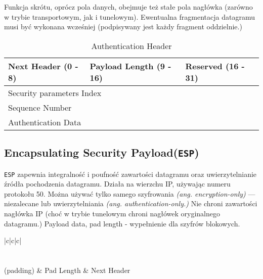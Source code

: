 \documentclass{article}
\begin{document}
Funkcja skrótu, oprócz pola danych, obejmuje też stałe pola nagłówka (zarówno w trybie transportowym,
jak i tunelowym). Ewentualna fragmentacja datagramu musi być wykonana wcześniej (podpisywany jest
każdy fragment oddzielnie.)

\begin{table}
  \begin{tabular}{@{}lll@{}}
    \toprule
    \multicolumn{1}{|l|}{Next Header (0 - 8)} & \multicolumn{1}{l|}{Payload Length (9 - 16)} & \multicolumn{1}{l|}{Reserved (16 - 31)} \\ \midrule
    \multicolumn{3}{|l|}{Security parameters Index} \\ \midrule
    \multicolumn{3}{|l|}{Sequence Number} \\ \midrule
    \multicolumn{3}{|l|}{Authentication Data} \\ \bottomrule
  \end{tabular}
  \caption{Authentication Header}
  \label{AH}
\end{table}

\subsection{Encapsulating Security Payload({\tt ESP})}

{\tt ESP} zapewnia integralność i poufność zawartości datagramu oraz uwierzytelnianie źródła pochodzenia datagramu.
Działa na wierzchu IP, używając numeru protokołu 50.
Można używać tylko samego szyfrowania \emph{(ang. encryption-only)} --- niezalecane lub uwierzytelniania \emph{(ang. authentication-only.)}
Nie chroni zawartości nagłówka IP (choć w trybie tunelowym chroni nagłówek oryginalnego datagramu.)
Payload data, pad length - wypełnienie dla szyfrów blokowych.

\begin{table}
  \begin{tabular}{|c|c|c|}
    \hline
     \\ \hline
     \\ \hline
     \\  
    (padding) & Pad Length & Next Header \\ \hline
   \\ \hline
  \end{tabular}
  \caption{Encapsulating Security Payload}
  \label{ESP}
\end{table}
\pagebreak
\end{document}
